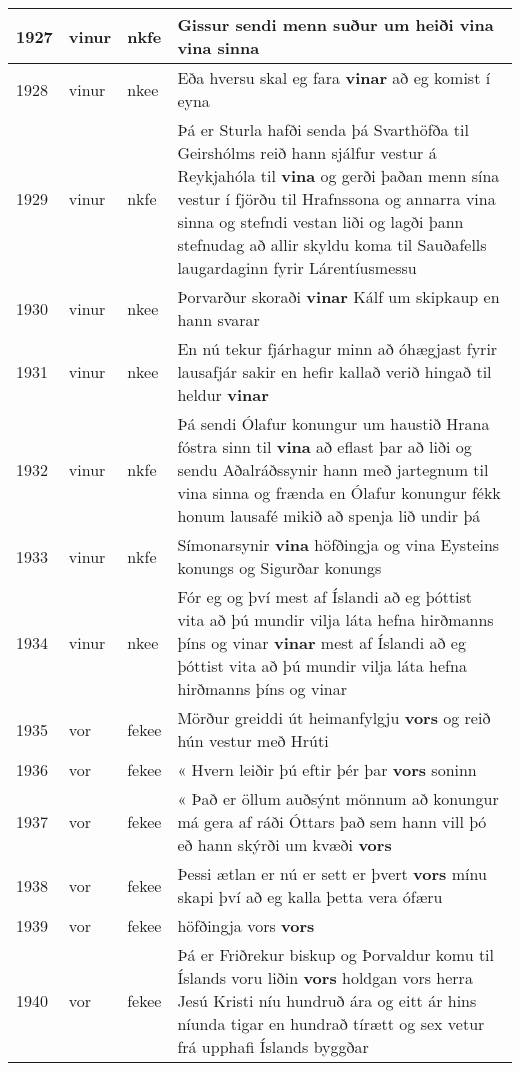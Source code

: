 \documentclass{article}
\begin{document}
\begin{longtable}{p{1cm}|p{1cm}|p{1cm}|p{13cm}}
\hline
1927&vinur&nkfe&Gissur sendi menn suður um heiði \textbf{vina} vina sinna\\
\hline
1928&vinur&nkee&Eða hversu skal eg fara \textbf{vinar} að eg komist í eyna\\
\hline
1929&vinur&nkfe&Þá er Sturla hafði senda þá Svarthöfða til Geirshólms reið hann sjálfur vestur á Reykjahóla til \textbf{vina} og gerði þaðan menn sína vestur í fjörðu til Hrafnssona og annarra vina sinna og stefndi vestan liði og lagði þann stefnudag að allir skyldu koma til Sauðafells laugardaginn fyrir Lárentíusmessu\\
\hline
1930&vinur&nkee&Þorvarður skoraði \textbf{vinar} Kálf um skipkaup en hann svarar\\
\hline
1931&vinur&nkee&En nú tekur fjárhagur minn að óhægjast fyrir lausafjár sakir en hefir kallað verið hingað til heldur \textbf{vinar} \\
\hline
1932&vinur&nkfe&Þá sendi Ólafur konungur um haustið Hrana fóstra sinn til \textbf{vina} að eflast þar að liði og sendu Aðalráðssynir hann með jartegnum til vina sinna og frænda en Ólafur konungur fékk honum lausafé mikið að spenja lið undir þá\\
\hline
1933&vinur&nkfe&Símonarsynir \textbf{vina} höfðingja og vina Eysteins konungs og Sigurðar konungs\\
\hline
1934&vinur&nkee&Fór eg og því mest af Íslandi að eg þóttist vita að þú mundir vilja láta hefna hirðmanns þíns og vinar \textbf{vinar} mest af Íslandi að eg þóttist vita að þú mundir vilja láta hefna hirðmanns þíns og vinar\\
\hline
1935&vor&fekee&Mörður greiddi út heimanfylgju \textbf{vors} og reið hún vestur með Hrúti\\
\hline
1936&vor&fekee&« Hvern leiðir þú eftir þér þar \textbf{vors} soninn\\
\hline
1937&vor&fekee&« Það er öllum auðsýnt mönnum að konungur má gera af ráði Óttars það sem hann vill þó eð hann skýrði um kvæði \textbf{vors} \\
\hline
1938&vor&fekee&Þessi ætlan er nú er sett er þvert \textbf{vors} mínu skapi því að eg kalla þetta vera ófæru\\
\hline
1939&vor&fekee&höfðingja vors \textbf{vors} \\
\hline
1940&vor&fekee&Þá er Friðrekur biskup og Þorvaldur komu til Íslands voru liðin \textbf{vors} holdgan vors herra Jesú Kristi níu hundruð ára og eitt ár hins níunda tigar en hundrað tírætt og sex vetur frá upphafi Íslands byggðar\\

\end{longtable}
\end{document}
